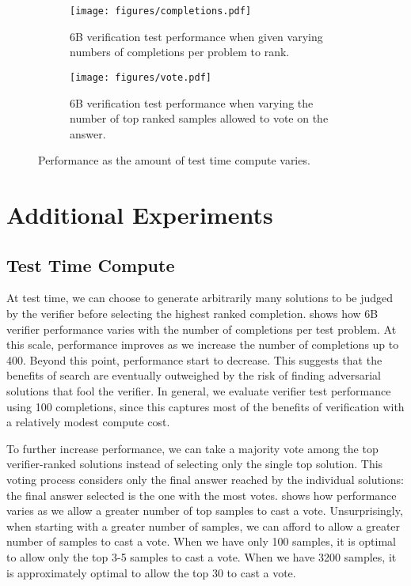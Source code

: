 {\begin{figure}
\centering
\begin{subfigure}{0.475 \textwidth}
\texttt{[image: figures/completions.pdf]}
\caption{6B verification test performance when given varying numbers of completions per problem to rank.} \label{fig:completions}
\end{subfigure}
\hspace*{\fill}
\begin{subfigure}{0.475 \textwidth}
\texttt{[image: figures/vote.pdf]}
\caption{6B verification test performance when varying the number of top ranked samples allowed to vote on the answer.} \label{fig:vote}
\end{subfigure}
\caption{Performance as the amount of test time compute varies.}
\label{fig:test_time_compute_trends}
\end{figure}

\section{Additional Experiments}

\subsection{Test Time Compute}

At test time, we can choose to generate arbitrarily many solutions to be judged by the verifier before selecting the highest ranked completion.  shows how 6B verifier performance varies with the number of completions per test problem. At this scale, performance improves as we increase the number of completions up to 400. Beyond this point, performance start to decrease. This suggests that the benefits of search are eventually outweighed by the risk of finding adversarial solutions that fool the verifier. In general, we evaluate verifier test performance using 100 completions, since this captures most of the benefits of verification with a relatively modest compute cost.

To further increase performance, we can take a majority vote among the top verifier-ranked solutions instead of selecting only the single top solution. This voting process considers only the final answer reached by the individual solutions: the final answer selected is the one with the most votes.  shows how performance varies as we allow a greater number of top samples to cast a vote. Unsurprisingly, when starting with a greater number of samples, we can afford to allow a greater number of samples to cast a vote. When we have only 100 samples, it is optimal to allow only the top 3-5 samples to cast a vote. When we have 3200 samples, it is approximately optimal to allow the top 30 to cast a vote.

}
